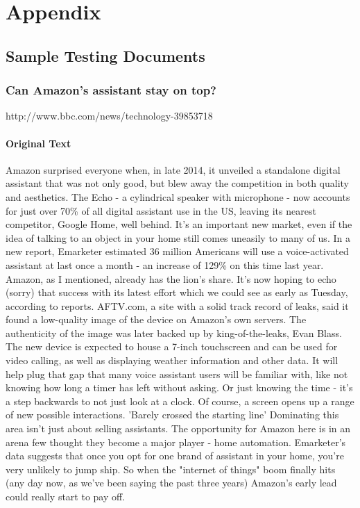 \chapter{Appendix}

\section{Sample Testing Documents}
\subsection{Can Amazon's assistant stay on top?}
http://www.bbc.com/news/technology-39853718
\subsubsection{Original Text}
Amazon surprised everyone when, in late 2014, it unveiled a standalone digital assistant that was not only good, but blew away the competition in both quality and aesthetics.
The Echo - a cylindrical speaker with microphone - now accounts for just over 70\% of all digital assistant use in the US, leaving its nearest competitor, Google Home, well behind.
It's an important new market, even if the idea of talking to an object in your home still comes uneasily to many of us.
In a new report, Emarketer estimated 36 million Americans will use a voice-activated assistant at last once a month - an increase of 129\% on this time last year.
Amazon, as I mentioned, already has the lion's share. It's now hoping to echo (sorry) that success with its latest effort which we could see as early as Tuesday, according to reports.
AFTV.com, a site with a solid track record of leaks, said it found a low-quality image of the device on Amazon's own servers.
The authenticity of the image was later backed up by king-of-the-leaks, Evan Blass. 
The new device is expected to house a 7-inch touchscreen and can be used for video calling, as well as displaying weather information and other data.
It will help plug that gap that many voice assistant users will be familiar with, like not knowing how long a timer has left without asking. Or just knowing the time - it's a step backwards to not just look at a clock. Of course, a screen opens up a range of new possible interactions.
'Barely crossed the starting line'
Dominating this area isn't just about selling assistants. The opportunity for Amazon here is in an arena few thought they become a major player - home automation. Emarketer's data suggests that once you opt for one brand of assistant in your home, you're very unlikely to jump ship. So when the "internet of things" boom finally hits (any day now, as we've been saying the past three years) Amazon's early lead could really start to pay off.
